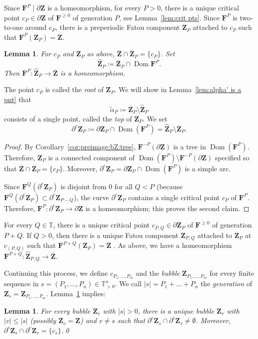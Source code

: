 \documentclass{amsart}
\newcommand{\Dom}{\operatorname {Dom}}
\newcommand{\1}{{\mathbb 1 }}
\newcommand\PT{\mathbb{ T}}
\newcommand{\bF}{{\mathbf F}}
\newcommand{\bZ}{{\mathbf Z}}
\newtheorem{lem}[thm]{Lemma}
\theoremstyle{remark}
\numberwithin{equation}{section}
\theoremstyle{definition}
\theoremstyle{nonumberbreak}
\begin{document}
 
 Since $\bF^P\mid \partial \bZ$ is a homeomorphism, for every $P>0$, there is a unique critical point $c_P\in \partial \bZ$ of $\bF^{\ge 0}$ of generation $P$, see Lemma~\ref{lem:crit pts}. Since $\bF^P$ is two-to-one around $c_P$, there is a preperiodic Fatou component $\bZ_P$ attached to $c_P$ such that $\bF^P(\bZ_P)=\bZ$. 
\begin{lem}
\label{lem:Z_p is att to Z}
For $c_P$ and $\bZ_P$ as above, $\overline \bZ\cap \overline \bZ_P=\{c_P\}$.  Set \[\widehat \bZ_P\coloneqq  \overline \bZ_P\cap \Dom \bF^P.\] Then $\bF^P\colon \widehat \bZ_P\to \overline \bZ$ is a homeomorphism.
\end{lem}
\noindent The point $c_P$ is called the \emph{root} of $\bZ_P$.  We will show in Lemma~\ref{lem:alpha' is a pnt} that \[\widetilde \alpha_P\coloneqq \overline \bZ_P\setminus \widehat \bZ_P\] consists of a single point, called the \emph{top} of $\bZ_P$. We set 
\[\partial^c \bZ_P\coloneqq \partial \bZ_P \cap \Dom (\bF^P)=\widehat \bZ_P\setminus\bZ_P. \]
\begin{proof}
By Corollary~\ref{cor:preimage:bZ:tree}, $\bF^{-P}(\partial \bZ)$ is a tree in $\Dom(\bF^P)$. Therefore, $\bZ_P$ is a connected component of $\Dom(\bF^P)\setminus \bF^{-P}(\partial \bZ)$ specified so that $\overline \bZ\cap \overline \bZ_P=\{c_P\}$. Moreover, $\partial^c \bZ_P=\partial \bZ_P\cap \Dom(\bF^P)$ is a simple arc. 

Since $\bF^Q(\partial^c \bZ_P)$ is disjoint from $0$ for all $Q< P$ (because $\bF^Q(\partial^c \bZ_P)\subset \partial^c \bZ_{P-Q}$), the curve $\partial^c \bZ_P$ contains a single critical point $c_P$ of $\bF^P$. Therefore, $\bF^P\colon \partial^c \bZ_P \to \partial \bZ$ is a homeomorphism; this proves the second claim. 
\end{proof}




For every $Q\in \PT$, there is a unique critical point $c_{P,Q}\in \partial \bZ_P$ of $\bF^{\ge0}$ of generation $P+Q$. If $Q>0$, then there is a unique Fatou component $\bZ_{P,Q}$ attached to $\bZ_P$ at $c_{(P,Q)}$ such that $\bF^{P+Q}(\bZ_P)=\bZ$ . As above, we have a homeomorphism $\bF^{P+Q}\colon \widehat \bZ_{P,Q} \to \overline \bZ$. 

Continuing this process, we define $c_{P_1,\dots , P_m}$ and the \emph{bubble} $\bZ_{P_1,\dots , P_m}$ for every finite sequence in $s=(P_1,\dots, P_n)\in \PT^n_{>0}$. We call $|s|=P_1+\dots+P_n$ the \emph{generation} of $\bZ_s=\bZ_{P_1,\dots , P_m}$. Lemma~\ref{lem:Z_p is att to Z} implies:
\begin{lem}
\label{lem:Z_s is att to Z_v}
For every bubble $\bZ_s$ with $|s|>0$, there is a unique bubble $\bZ_v$ with $|v|\le |s|$ (possibly $\bZ_v=\bZ$) and $v\not=s$ such that $\partial^c \bZ_s\cap \partial^c \bZ_v  \not=\emptyset$.  Moreover, $\partial^c \bZ_s\cap \partial^c \bZ_v=\{c_s\}$.\qed
\end{lem}
\end{document}
